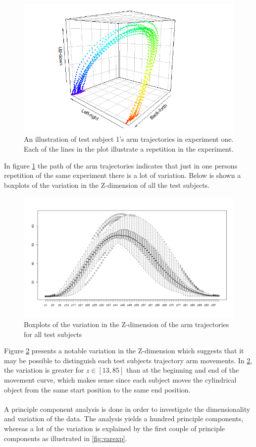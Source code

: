 \documentclass[11pt, fleqn, titlepage]{article}
\begin{document}
\begin{figure}[H]
	\centering
	\includegraphics[scale=0.6]{billeder/Rplot.png}
	\caption{An illustration of test subject 1's arm trajectories in experiment one. Each of the lines in the plot illustrate a repetition in the experiment. }
	\label{fig:rplot}
\end{figure}
\noindent
In figure \ref{fig:rplot} the path of the arm trajectories indicates that just in one persons repetition of the same experiment there is a lot of variation. Below is shown a boxplots of the variation in the Z-dimension of all the test subjects.

\begin{figure}[H]
	\centering
	\includegraphics[width=0.55\linewidth]{billeder/boxplot_z.pdf}
	\caption{Boxplots of the variation in the Z-dimension of the arm trajectories for all test subjects}
	\label{fig:boxplotz}
\end{figure}
\noindent
Figure \ref{fig:boxplotz} presents a notable variation in the Z-dimension which suggests that it may be possible to distinguish each test subjects trajectory arm movements. In \ref{fig:boxplotz}, the variation is greater for $ z \in [13,85] $ than at the beginning and end of the movement curve, which makes sense since each subject moves the cylindrical object from the same start position to the same end position.
\\\\
A principle component analysis is done in order to investigate the dimensionality and variation of the data. The analysis yields a hundred principle components, whereas a lot of the variation is explained by the first couple of principle components as illustrated in \ref{fig:varexp}.
\end{document}
